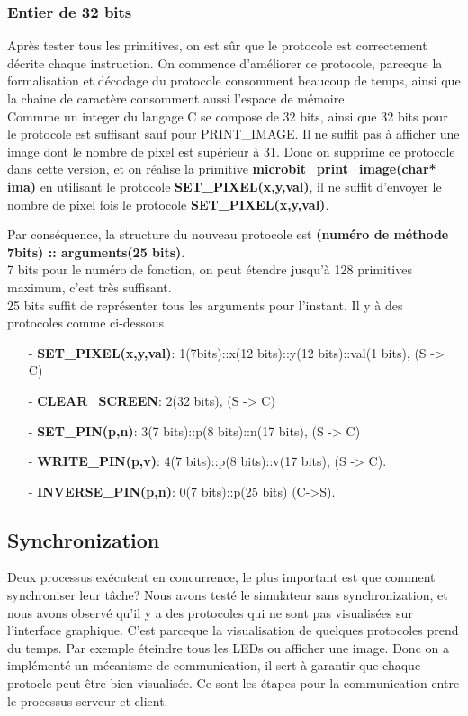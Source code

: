 \documentclass[14px]{article}
\begin{document}
\subsubsection{Entier de 32 bits}
Après tester tous les primitives, on est sûr que le protocole est correctement décrite chaque instruction. On commence d'améliorer ce protocole, parceque la formalisation et décodage du protocole consomment beaucoup de temps, ainsi que la chaine de caractère consomment aussi l'espace de mémoire.\\
Commme un integer du langage C se compose de 32 bits, ainsi que 32 bits pour le protocole est suffisant sauf pour PRINT\_IMAGE. Il ne suffit pas à afficher une image dont le nombre de pixel est supérieur à 31. Donc on supprime ce protocole dans cette version, et on réalise la primitive \textbf{microbit\_print\_image(char* ima)} en utilisant le protocole \textbf{SET\_PIXEL(x,y,val)}, il ne suffit d'envoyer le nombre de pixel fois le protocole \textbf{SET\_PIXEL(x,y,val)}.

Par conséquence, la structure du nouveau protocole est \textbf{(numéro de méthode 7bits) :: arguments(25 bits)}.\\
7 bits pour le numéro de fonction, on peut étendre jusqu'à 128 primitives maximum, c'est très suffisant. \\ 25 bits suffit de représenter tous les arguments pour l'instant.
Il y à des protocoles comme ci-dessous
\begin{enumerate}
	\item[-] \textbf{SET\_PIXEL(x,y,val)}: 1(7bits)::x(12 bits)::y(12 bits)::val(1 bits), (S -> C)
	\item[-] \textbf{CLEAR\_SCREEN}: 2(32 bits), (S -> C)
	\item[-] \textbf{SET\_PIN(p,n)}: 3(7 bits)::p(8 bits)::n(17 bits), (S -> C)
	\item[-] \textbf{WRITE\_PIN(p,v)}: 4(7 bits)::p(8 bits)::v(17 bits), (S -> C).\\
	
	\item[-] \textbf{INVERSE\_PIN(p,n)}: 0(7 bits)::p(25 bits) (C->S).
\end{enumerate}


\subsection{Synchronization}
Deux processus exécutent en concurrence, le plus important est que comment synchroniser leur tâche? Nous avons testé le simulateur sans synchronization, et nous avons observé qu'il y a des protocoles qui ne sont pas visualisées sur l'interface graphique. C'est parceque la visualisation de quelques protocoles prend du temps. Par exemple éteindre tous les LEDs ou afficher une image. Donc on a implémenté un mécanisme de communication, il sert à garantir que chaque protocle peut être bien visualisée. Ce sont les étapes pour la communication entre le processus serveur et client.
\end{document}
